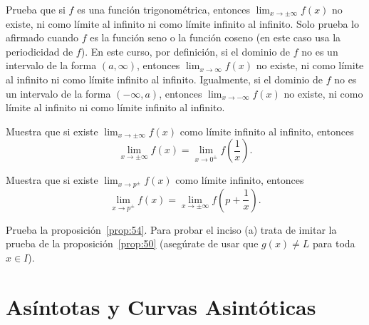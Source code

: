 \documentclass[12pt,a4paper]{book}
\begin{document}
    \begin{ejercicio}\label{ej:183}
        Prueba que si $f$ es una función trigonométrica, entonces
        $\lim_{x\to\pm\infty}f(x)$ no existe, ni como límite al infinito ni como límite infinito
        al infinito. \sugerencia Solo prueba lo afirmado cuando $f$ es la función seno
        o la función coseno (en este caso usa la periodicidad de $f$). En este curso, por
        definición, si el dominio de $f$ no es un intervalo de la forma $(a,\infty)$, entonces
        $\lim_{x\to\infty}f(x)$ no existe, ni como límite al infinito ni como límite infinito al
        infinito. Igualmente, si el dominio de $f$ no es un intervalo de la forma $(-\infty,a)$,
        entonces $\lim_{x\to-\infty}f(x)$ no existe, ni como límite al infinito ni como límite
        infinito al infinito.
    \end{ejercicio}

    \begin{ejercicio}\label{ej:184}
        Muestra que si existe $\lim_{x\to\pm\infty}f(x)$ como límite infinito al infinito,
        entonces
        \begin{equation*}
            \lim_{x\to\pm\infty}f(x)=\lim_{x\to 0^{\pm}}f\left(\frac{1}{x}\right).
        \end{equation*}
    \end{ejercicio}

    \begin{ejercicio}\label{ej:185}
        Muestra que si existe $\lim_{x\to p^{\pm}}f(x)$ como límite infinito, entonces
        \begin{equation*}
            \lim_{x\to p^{\pm}}f(x)=\lim_{x\to\pm\infty}f\left(p+\frac{1}{x}\right).
        \end{equation*}
    \end{ejercicio}

    \begin{ejercicio}\label{ej:186}
        Prueba la proposición~\ref{prop:54}. \sugerencia Para probar el inciso
        (a) trata de imitar la prueba de la proposición~\ref{prop:50} (asegúrate de usar que
        $g(x)\neq L$ para toda $x\in I$).
    \end{ejercicio}

    \section{Asíntotas y Curvas Asintóticas}
\end{document}
